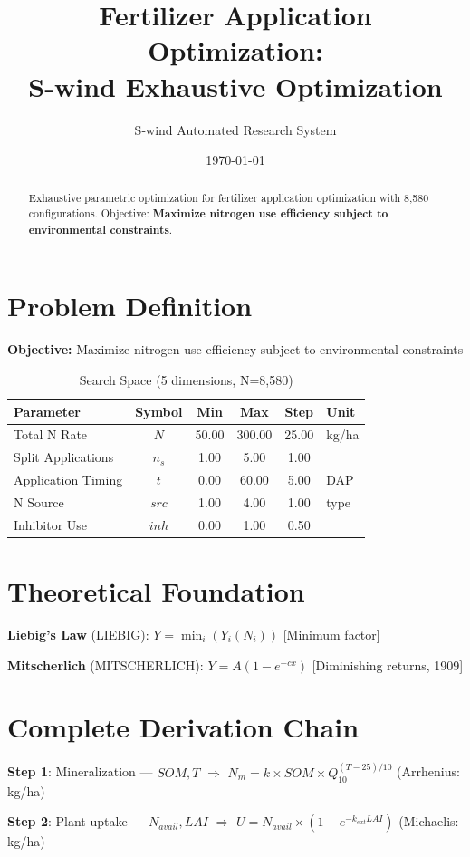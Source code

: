 \documentclass[11pt,twocolumn]{article}
\title{Fertilizer Application Optimization: \\S-wind Exhaustive Optimization}
\author{S-wind Automated Research System}
\date{\today}
\begin{document}
\maketitle

\begin{abstract}
Exhaustive parametric optimization for fertilizer application optimization with 8,580 configurations.
Objective: \textbf{Maximize nitrogen use efficiency subject to environmental constraints}.
\end{abstract}

\section{Problem Definition}
\textbf{Objective:} Maximize nitrogen use efficiency subject to environmental constraints

\begin{table}[h]
\centering
\caption{Search Space (5 dimensions, N=8,580)}
\begin{tabular}{@{}lccccl@{}}
\toprule
Parameter & Symbol & Min & Max & Step & Unit \\
\midrule
Total N Rate & $N$ & 50.00 & 300.00 & 25.00 & kg/ha \\
Split Applications & $n_s$ & 1.00 & 5.00 & 1.00 &  \\
Application Timing & $t$ & 0.00 & 60.00 & 5.00 & DAP \\
N Source & $src$ & 1.00 & 4.00 & 1.00 & type \\
Inhibitor Use & $inh$ & 0.00 & 1.00 & 0.50 &  \\
\bottomrule
\end{tabular}
\end{table}

\section{Theoretical Foundation}
\textbf{Liebig's Law} (LIEBIG): $Y = \min_i(Y_i(N_i))$ [Minimum factor]

\textbf{Mitscherlich} (MITSCHERLICH): $Y = A(1-e^{-cx})$ [Diminishing returns, 1909]


\section{Complete Derivation Chain}
\textbf{Step 1}: Mineralization --- $SOM, T$ $\Rightarrow$ $N_m = k \times SOM \times Q_{10}^{(T-25)/10}$ (Arrhenius: kg/ha)


\textbf{Step 2}: Plant uptake --- $N_{avail}, LAI$ $\Rightarrow$ $U = N_{avail} \times (1-e^{-k_{ext} LAI})$ (Michaelis: kg/ha)
\end{document}
